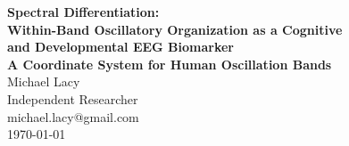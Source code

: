 \documentclass[11pt,a4paper]{article}
\begin{document}
\begin{center}
{\LARGE \textbf{Spectral Differentiation:}}\\[0.1cm]
{\LARGE \textbf{Within-Band Oscillatory Organization as a Cognitive}}\\[0.1cm]
{\LARGE \textbf{and Developmental EEG Biomarker}}\\[0.3cm]
{\Large \textbf{A Coordinate System for Human Oscillation Bands}}\\[1cm]

{\large Michael Lacy}\\[0.3cm]
{\small Independent Researcher}\\[0.3cm]
{\small michael.lacy@gmail.com}\\[0.5cm]

\today
\end{center}

\vspace{0.5cm}
\end{document}
